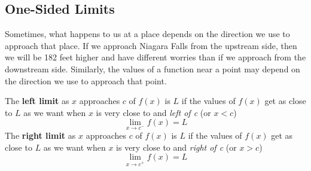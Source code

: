 \subsection*{One-Sided Limits}
\begin{comment}
\begin{itemize}
    \item One-Sided Limits at the bottom of page 143 of \cite{openstax} text.
    \item One-Sided Limits; page 82 of \cite{Hoffman} text.
\end{itemize}
\end{comment}
Sometimes, what happens to us at a place depends on the direction we use to
approach that place. If we approach Niagara Falls from the upstream side, then we
will be 182 feet higher and have different worries than if we approach from the
downstream side. Similarly, the values of a function near a point may depend on the
direction we use to approach that point.
\begin{tcolorbox}[title = {Definition of Left and Right Limits}]
The \textbf{left limit} as $x$ approaches $c$ of $f(x)$ is $L$ if the values of $f(x)$ get as close to $L$ as we want when $x$ is very close to and \emph{left of c} (or $x<c$) 
\vspace{-0.25cm}
\begin{equation}\label{eq:leftLimitDef}
\lim\limits_{x \to c^-}f(x)=L
\end{equation}
The \textbf{right limit} as $x$ approaches $c$ of $f(x)$ is $L$ if the values of $f(x)$ get as close to $L$ as we want when $x$ is very close to and \emph{right of c} (or $x>c$) 
\vspace{-0.25cm}
\begin{equation}\label{eq:limitRule2}
\lim\limits_{x \to c^+}f(x)=L
\end{equation}

\end{tcolorbox}
